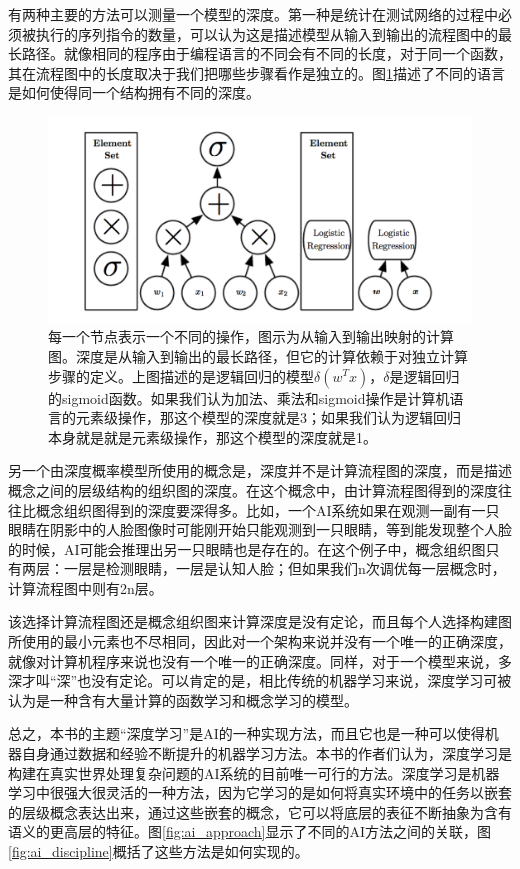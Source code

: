 \documentclass[a4paper,11pt]{book}
\begin{document}
有两种主要的方法可以测量一个模型的深度。第一种是统计在测试网络的过程中必须被执行的序列指令的数量，可以认为这是描述模型从输入到输出的流程图中的最长路径。就像相同的程序由于编程语言的不同会有不同的长度，对于同一个函数，其在流程图中的长度取决于我们把哪些步骤看作是独立的。图\ref{fig:flow_chart}描述了不同的语言是如何使得同一个结构拥有不同的深度。

\begin{figure}[htbp] %
   \centering
   \includegraphics[width=5in]{fig/chap1/flow_chart.png} 
   \caption{每一个节点表示一个不同的操作，图示为从输入到输出映射的计算图。深度是从输入到输出的最长路径，但它的计算依赖于对独立计算步骤的定义。上图描述的是逻辑回归的模型$\delta(w^Tx)$，$\delta$是逻辑回归的sigmoid函数。如果我们认为加法、乘法和sigmoid操作是计算机语言的元素级操作，那这个模型的深度就是3；如果我们认为逻辑回归本身就是就是元素级操作，那这个模型的深度就是1。}
   \label{fig:flow_chart}
\end{figure}


另一个由深度概率模型所使用的概念是，深度并不是计算流程图的深度，而是描述概念之间的层级结构的组织图的深度。在这个概念中，由计算流程图得到的深度往往比概念组织图得到的深度要深得多。比如，一个AI系统如果在观测一副有一只眼睛在阴影中的人脸图像时可能刚开始只能观测到一只眼睛，等到能发现整个人脸的时候，AI可能会推理出另一只眼睛也是存在的。在这个例子中，概念组织图只有两层：一层是检测眼睛，一层是认知人脸；但如果我们n次调优每一层概念时，计算流程图中则有2n层。


该选择计算流程图还是概念组织图来计算深度是没有定论，而且每个人选择构建图所使用的最小元素也不尽相同，因此对一个架构来说并没有一个唯一的正确深度，就像对计算机程序来说也没有一个唯一的正确深度。同样，对于一个模型来说，多深才叫“深”也没有定论。可以肯定的是，相比传统的机器学习来说，深度学习可被认为是一种含有大量计算的函数学习和概念学习的模型。

总之，本书的主题“深度学习”是AI的一种实现方法，而且它也是一种可以使得机器自身通过数据和经验不断提升的机器学习方法。本书的作者们认为，深度学习是构建在真实世界处理复杂问题的AI系统的目前唯一可行的方法。深度学习是机器学习中很强大很灵活的一种方法，因为它学习的是如何将真实环境中的任务以嵌套的层级概念表达出来，通过这些嵌套的概念，它可以将底层的表征不断抽象为含有语义的更高层的特征。图\ref{fig:ai_approach}显示了不同的AI方法之间的关联，图\ref{fig:ai_discipline}概括了这些方法是如何实现的。
\end{document}
